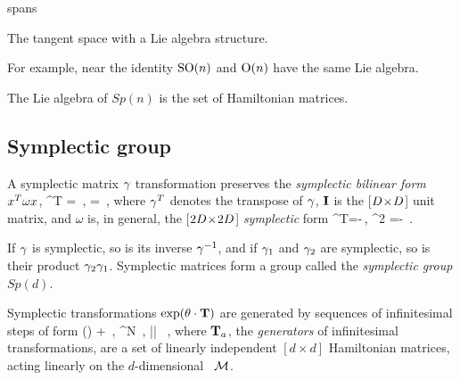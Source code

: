 spans

The tangent space with a Lie algebra structure.

For example, near the identity $\textrm{SO}(n)$ and $\textrm{O}(n)$ have the same Lie algebra.


The Lie algebra of $Sp(n)$ is the set of Hamiltonian matrices.


\subsection{Symplectic group}
\label{sect:SymplctGroup}

A symplectic matrix $\gamma$ transformation preserves the
\emph{symplectic bilinear form} $x^T {\bf \omega} x$,
\beq
\LieEl^T {\bf \omega} \LieEl = {\bf \omega}
    \,, \quad\quad
{\omega} = 
	\,,
where
$\gamma^T$ denotes the transpose of $\gamma$, ${\bf I}$ is the
[$D\!\times\!D$] unit matrix, and ${\omega}$ is, in general, the
[$2D\!\times\!2D$] {\em symplectic} form
\beq
{\bf \omega}^T=-{\bf \omega}\,,
\qquad {\bf \omega}^2 =- \matId
\,.


If $\gamma$ is symplectic, so is its inverse $\gamma^{-1}$, and if
$\gamma_1$ and $\gamma_2$ are symplectic, so is their product $\gamma_2
\gamma_1$. Symplectic matrices form a group called the \emph{symplectic
group} $Sp(d)$.


{Symplectic} transformations $ \exp(\theta \cdot {\ensuremath{\mathbf{T}}}) $ are
generated by sequences of infinitesimal steps of form
\beq
\LieEl(\delta\gSpace)  + \delta \gSpace \cdot \Lg
    \,,\quad
\delta\gSpace \in \reals^N
    \,,\quad
|\delta \gSpace| 
    \, ,
where $\mathbf{T}_a$, the {\em generators} of infinitesimal
transformations, are a set of linearly independent
$[d\!\times\!d]$ Hamiltonian matrices,
acting linearly on the $d$-dim\-ens\-ion\-al
\statesp\ ${\cal M}$.

